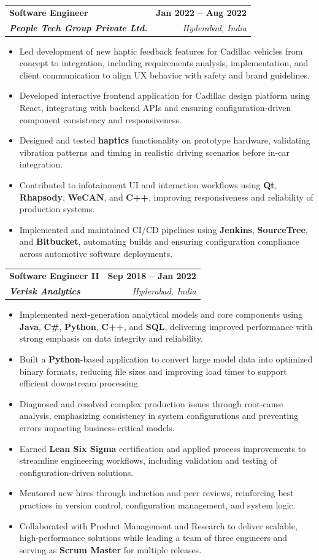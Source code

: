 \documentclass[letterpaper,11pt]{article}
\makeatletter
\newcommand{\resumeItem}[1]{
  \item\small{
    {#1 \vspace{-2pt}}
  }
}
\newcommand{\resumeSubheading}[4]{
  \vspace{-2pt}\item
    \begin{tabular*}{1.0\textwidth}[t]{l@{\extracolsep{\fill}}r}
      \textbf{#1} & \textbf{\small #2} \\
      \textit{\small#3} & \textit{\small #4} \\
    \end{tabular*}\vspace{-7pt}
}
\newcommand{\resumeItemListStart}{\begin{itemize}}
\newcommand{\resumeItemListEnd}{\end{itemize}\vspace{-5pt}}
\makeatother
\begin{document}
    \resumeSubheading
      {\textbf{Software Engineer}}{\textbf{Jan 2022 -- Aug 2022}}
      {\textbf{People Tech Group Private Ltd.}}{Hyderabad, India}
      \resumeItemListStart
        \resumeItem{Led development of new haptic feedback features for Cadillac vehicles from concept to integration, including requirements analysis, implementation, and client communication to align UX behavior with safety and brand guidelines.}
        \resumeItem{Developed interactive frontend application for Cadillac design platform using React, integrating with backend APIs and ensuring configuration-driven component consistency and responsiveness.}
        \resumeItem{Designed and tested \textbf{haptics} functionality on prototype hardware, validating vibration patterns and timing in realistic driving scenarios before in-car integration.}
        \resumeItem{Contributed to infotainment UI and interaction workflows using \textbf{Qt}, \textbf{Rhapsody}, \textbf{WeCAN}, and \textbf{C++}, improving responsiveness and reliability of production systems.}
        \resumeItem{Implemented and maintained CI/CD pipelines using \textbf{Jenkins}, \textbf{SourceTree}, and \textbf{Bitbucket}, automating builds and ensuring configuration compliance across automotive software deployments.}
      \resumeItemListEnd

    \resumeSubheading
      {\textbf{Software Engineer II}}{\textbf{Sep 2018 -- Jan 2022}}
      {\textbf{Verisk Analytics}}{Hyderabad, India}
      \resumeItemListStart
        \resumeItem{Implemented next-generation analytical models and core components using \textbf{Java}, \textbf{C\#}, \textbf{Python}, \textbf{C++}, and \textbf{SQL}, delivering improved performance with strong emphasis on data integrity and reliability.}
        \resumeItem{Built a \textbf{Python}-based application to convert large model data into optimized binary formats, reducing file sizes and improving load times to support efficient downstream processing.}
        \resumeItem{Diagnosed and resolved complex production issues through root-cause analysis, emphasizing consistency in system configurations and preventing errors impacting business-critical models.}
        \resumeItem{Earned \textbf{Lean Six Sigma} certification and applied process improvements to streamline engineering workflows, including validation and testing of configuration-driven solutions.}
        \resumeItem{Mentored new hires through induction and peer reviews, reinforcing best practices in version control, configuration management, and system logic.}
        \resumeItem{Collaborated with Product Management and Research to deliver scalable, high-performance solutions while leading a team of three engineers and serving as \textbf{Scrum Master} for multiple releases.}
      \resumeItemListEnd
\end{document}
